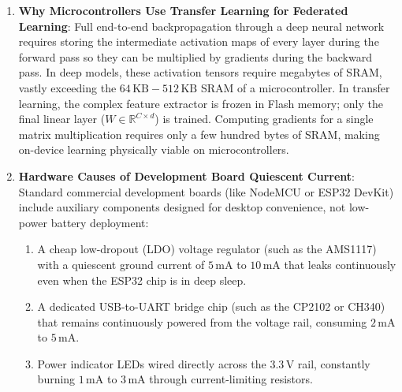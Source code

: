 \begin{enumerate}
    \item \textbf{Why Microcontrollers Use Transfer Learning for Federated Learning}:
    Full end-to-end backpropagation through a deep neural network requires storing the intermediate activation maps of every layer during the forward pass so they can be multiplied by gradients during the backward pass. In deep models, these activation tensors require megabytes of SRAM, vastly exceeding the $64\,\text{KB} - 512\,\text{KB}$ SRAM of a microcontroller. In transfer learning, the complex feature extractor is frozen in Flash memory; only the final linear layer ($W \in \mathbb{R}^{C \times d}$) is trained. Computing gradients for a single matrix multiplication requires only a few hundred bytes of SRAM, making on-device learning physically viable on microcontrollers.

    \item \textbf{Hardware Causes of Development Board Quiescent Current}:
    Standard commercial development boards (like NodeMCU or ESP32 DevKit) include auxiliary components designed for desktop convenience, not low-power battery deployment:
    \begin{enumerate}
        \item A cheap low-dropout (LDO) voltage regulator (such as the AMS1117) with a quiescent ground current of $5\,\text{mA}$ to $10\,\text{mA}$ that leaks continuously even when the ESP32 chip is in deep sleep.
        \item A dedicated USB-to-UART bridge chip (such as the CP2102 or CH340) that remains continuously powered from the voltage rail, consuming $2\,\text{mA}$ to $5\,\text{mA}$.
        \item Power indicator LEDs wired directly across the $3.3\,\text{V}$ rail, constantly burning $1\,\text{mA}$ to $3\,\text{mA}$ through current-limiting resistors.
    \end{enumerate}
\end{enumerate}
